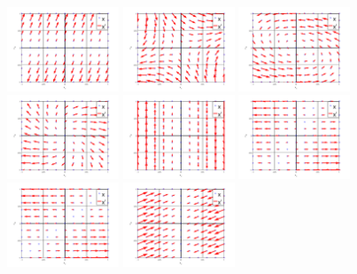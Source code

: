 \documentclass[12pt,a4paper]{article}
\begin{document}
    \includegraphics[width=0.25\textwidth]{A/9.png}
    \includegraphics[width=0.25\textwidth]{A/10.png}
    \includegraphics[width=0.25\textwidth]{A/11.png}
    \includegraphics[width=0.25\textwidth]{A/12.png}
    \includegraphics[width=0.25\textwidth]{A/13.png}
    \includegraphics[width=0.25\textwidth]{A/14.png}
    \includegraphics[width=0.25\textwidth]{A/15.png}
    \includegraphics[width=0.25\textwidth]{A/16.png}
\end{document}
